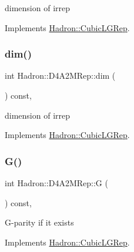 dimension of irrep 

Implements \mbox{\hyperlink{structHadron_1_1CubicLGRep_a3acbaea26503ed64f20df693a48e4cdd}{Hadron\+::\+Cubic\+L\+G\+Rep}}.

\mbox{\label{structHadron_1_1D4A2MRep_a9f511013d556bb6632884f49e20d5c7e}} 
\subsubsection{\texorpdfstring{dim()}{dim()}\hspace{0.1cm}{\footnotesize\ttfamily [2/2]}}
{\footnotesize\ttfamily int Hadron\+::\+D4\+A2\+M\+Rep\+::dim (\begin{DoxyParamCaption}{ }\end{DoxyParamCaption}) const\hspace{0.3cm}{\ttfamily [inline]}, {\ttfamily [virtual]}}

dimension of irrep 

Implements \mbox{\hyperlink{structHadron_1_1CubicLGRep_a3acbaea26503ed64f20df693a48e4cdd}{Hadron\+::\+Cubic\+L\+G\+Rep}}.

\mbox{\label{structHadron_1_1D4A2MRep_ae60f1ea025e472e961b4c3804a34f1e0}} 
\subsubsection{\texorpdfstring{G()}{G()}\hspace{0.1cm}{\footnotesize\ttfamily [1/2]}}
{\footnotesize\ttfamily int Hadron\+::\+D4\+A2\+M\+Rep\+::G (\begin{DoxyParamCaption}{ }\end{DoxyParamCaption}) const\hspace{0.3cm}{\ttfamily [inline]}, {\ttfamily [virtual]}}

G-\/parity if it exists 

Implements \mbox{\hyperlink{structHadron_1_1CubicLGRep_ace26f7b2d55e3a668a14cb9026da5231}{Hadron\+::\+Cubic\+L\+G\+Rep}}.

\mbox{\label{structHadron_1_1D4A2MRep_ae60f1ea025e472e961b4c3804a34f1e0}} 
